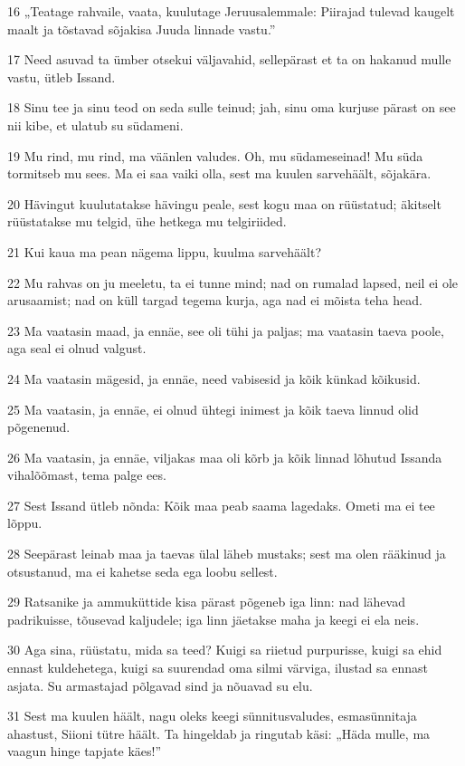 \par 16 „Teatage rahvaile, vaata, kuulutage Jeruusalemmale: Piirajad tulevad kaugelt maalt ja tõstavad sõjakisa Juuda linnade vastu.”
\par 17 Need asuvad ta ümber otsekui väljavahid, sellepärast et ta on hakanud mulle vastu, ütleb Issand.
\par 18 Sinu tee ja sinu teod on seda sulle teinud; jah, sinu oma kurjuse pärast on see nii kibe, et ulatub su südameni.
\par 19 Mu rind, mu rind, ma väänlen valudes. Oh, mu südameseinad! Mu süda tormitseb mu sees. Ma ei saa vaiki olla, sest ma kuulen sarvehäält, sõjakära.
\par 20 Hävingut kuulutatakse hävingu peale, sest kogu maa on rüüstatud; äkitselt rüüstatakse mu telgid, ühe hetkega mu telgiriided.
\par 21 Kui kaua ma pean nägema lippu, kuulma sarvehäält?
\par 22 Mu rahvas on ju meeletu, ta ei tunne mind; nad on rumalad lapsed, neil ei ole arusaamist; nad on küll targad tegema kurja, aga nad ei mõista teha head.
\par 23 Ma vaatasin maad, ja ennäe, see oli tühi ja paljas; ma vaatasin taeva poole, aga seal ei olnud valgust.
\par 24 Ma vaatasin mägesid, ja ennäe, need vabisesid ja kõik künkad kõikusid.
\par 25 Ma vaatasin, ja ennäe, ei olnud ühtegi inimest ja kõik taeva linnud olid põgenenud.
\par 26 Ma vaatasin, ja ennäe, viljakas maa oli kõrb ja kõik linnad lõhutud Issanda vihalõõmast, tema palge ees.
\par 27 Sest Issand ütleb nõnda: Kõik maa peab saama lagedaks. Ometi ma ei tee lõppu.
\par 28 Seepärast leinab maa ja taevas ülal läheb mustaks; sest ma olen rääkinud ja otsustanud, ma ei kahetse seda ega loobu sellest.
\par 29 Ratsanike ja ammuküttide kisa pärast põgeneb iga linn: nad lähevad padrikuisse, tõusevad kaljudele; iga linn jäetakse maha ja keegi ei ela neis.
\par 30 Aga sina, rüüstatu, mida sa teed? Kuigi sa riietud purpurisse, kuigi sa ehid ennast kuldehetega, kuigi sa suurendad oma silmi värviga, ilustad sa ennast asjata. Su armastajad põlgavad sind ja nõuavad su elu.
\par 31 Sest ma kuulen häält, nagu oleks keegi sünnitusvaludes, esmasünnitaja ahastust, Siioni tütre häält. Ta hingeldab ja ringutab käsi: „Häda mulle, ma vaagun hinge tapjate käes!”

